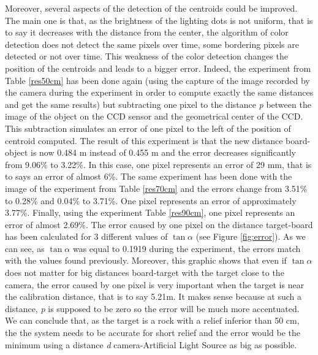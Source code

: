 Moreover, several aspects of the detection of the centroids could be improved. The main one is that, as the brightness of the lighting dots is not uniform, that is to say it decreases with the distance from the center, the algorithm of color detection does not detect the same pixels over time, some bordering pixels are detected or not over time. This weakness of the color detection changes the position of the centroids and leads to a bigger error. Indeed, the experiment from Table \ref{res50cm} has been done again (using the capture of the image recorded by the camera during the experiment in order to compute exactly the same distances and get the same results) but subtracting one pixel to the distance \emph{p} between the image of the object on the CCD sensor and the geometrical center of the CCD. This subtraction simulates an error of one pixel to the left of the position of centroid computed. The result of this experiment is that the new distance board-object is now 0.484 m instead of 0.455 m and the error decreases significantly from 9.06\% to 3.22\%. In this case, one pixel represents an error of 29 mm, that is to says an error of almost 6\%. The same experiment has been done with the image of the experiment from Table \ref{res70cm} and the errors change from 3.51\% to 0.28\% and 0.04\% to 3.71\%. One pixel represents an error of approximately 3.77\%. Finally, using the experiment Table \ref{res90cm}, one pixel represents an error of almost 2.69\%. The error caused by one pixel on the distance target-board has been calculated for 3 different values of $\tan \alpha$ (see Figure \ref{fig:error}). As we can see, as  $\tan \alpha$ was equal to 0.1919 during the experiment, the errors match with the values found previously. Moreover, this graphic shows that even if $\tan \alpha$ does not matter for big distances board-target with the target close to the camera, the error caused by one pixel is very important when the target is near the calibration distance, that is to say 5.21m. It makes sense because at such a distance, \emph{p} is supposed to be zero so the error will be much more accentuated. We can conclude that, as the target is a rock with a relief inferior than 50 cm, the the system needs to be accurate for short relief and the error would be the minimum using a distance \emph{d} camera-Artificial Light Source as big as possible.



